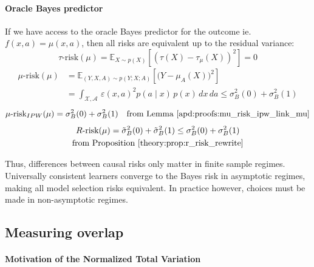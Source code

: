 \documentclass[a4paper,num-refs]{oup-contemporary}%
\begin{document}
\paragraph{Oracle Bayes predictor}\label{remark:bayes_oracle} If we
have access to the oracle Bayes predictor for the outcome ie.~$f(x,
    a)=\mu(x, a)$, then all risks are equivalent up to the residual variance:
\begin{equation}
    \tau\text{-risk}(\mu) = \mathbb E_{X\sim p(X)}[(\tau(X) - \tau_{\mu}(X))^2] = 0
\end{equation}
\begin{align}
    \mu\text{-risk}(\mu) & = \mathbb E_{(Y, X, A) \sim p(Y;X;A)}[\big( Y - \mu_A(X)\big)^2] \\
                         & = \int_{\mathcal X, \mathcal A}
    \,\varepsilon(x,a)^2 p(a \mid x) \,p(x) \,dx\,da  \leq \sigma_B^{2}(0) + \sigma_B^{2}(1) \nonumber
\end{align}
\begin{equation}
    \mu\text{-risk}_{IPW}(\mu) = \sigma_B^{2}(0) + \sigma_B^{2}(1)  \quad \text{from Lemma \ref{apd:proofs:mu_risk_ipw_link_mu}}
\end{equation}
\begin{multline}
    R\text{-risk}(\mu) = \tilde{\sigma}_B^{2}(0) + \tilde{\sigma}_B^{2}(1)
    \leq \sigma_B^{2}(0) + \sigma_B^{2}(1)  \\  \text{from Proposition \ref{theory:prop:r_risk_rewrite}}%
\end{multline}

Thus, differences between causal risks only matter in finite sample regimes.
Universally consistent learners converge to the Bayes risk in asymptotic
regimes, making all model selection risks equivalent. In practice however,
choices must be made in non-asymptotic regimes.


\subsection{Measuring overlap}\label{apd:motivation_ntv}

\paragraph{Motivation of the Normalized Total Variation}

\end{document}

